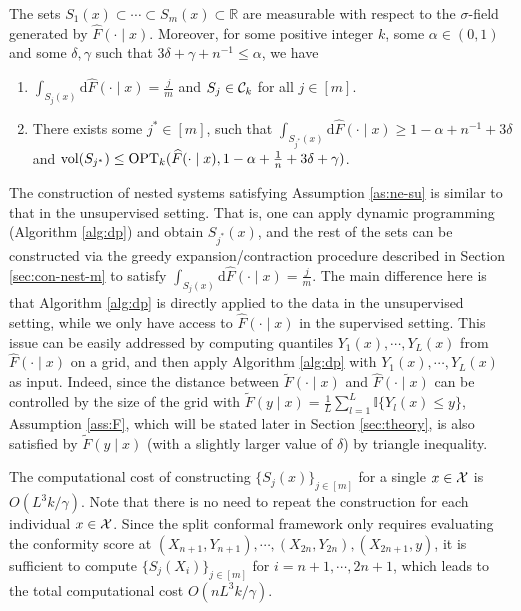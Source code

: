 \begin{assumption}\label{as:ne-su}
The sets $S_1(x)\subset\cdots\subset S_m(x)\subset\mathbb{R}$ are measurable with respect to the $\sigma$-field generated by $\widehat{F}(\cdot\mid x)$. Moreover, for some positive integer $k$, some $\alpha\in(0,1)$ and some $\delta,\gamma$ such that $3\delta+\gamma+n^{-1}\leq \alpha$, we have
\begin{enumerate}
\item $\int_{S_j(x)}\mathrm{d} \widehat{F}(\cdot\mid x)=\frac{j}{m}$ and $S_j\in\mathcal{C}_k$ for all $j\in[m]$.
\item There exists some $j^*\in[m]$, such that $\int_{S_{j^*}(x)}\mathrm{d} \widehat{F}(\cdot\mid x)\geq 1-\alpha+n^{-1}+3\delta$ and $\mathrm{vol}(S_{j^*})\leq \operatorname{OPT}_k(\widehat{F}(\cdot\mid x),1-\alpha+\frac{1}{n}+3\delta+\gamma)$.
\end{enumerate}
\end{assumption}
The construction of nested systems satisfying Assumption \ref{as:ne-su} is similar to that in the unsupervised setting. That is, one can apply dynamic programming (Algorithm \ref{alg:dp}) and obtain $S_{j^*}(x)$, and the rest of the sets can be constructed via the greedy expansion/contraction procedure described in Section \ref{sec:con-nest-m} to satisfy $\int_{S_j(x)}\mathrm{d} \widehat{F}(\cdot\mid x)=\frac{j}{m}$.  The main difference here is that Algorithm \ref{alg:dp} is directly applied to the data in the unsupervised setting, while we only have access to $\widehat{F}(\cdot\mid x)$ in the supervised setting. This issue can be easily addressed by computing quantiles $Y_1(x),\cdots,Y_L(x)$ from $\widehat{F}(\cdot\mid x)$ on a grid, and then apply Algorithm \ref{alg:dp} with $Y_1(x),\cdots,Y_L(x)$ as input. Indeed, since the distance between $\widetilde{F}(\cdot\mid x)$ and $\widehat{F}(\cdot\mid x)$ can be controlled by the size of the grid with $\widetilde{F}(y\mid x)=\frac{1}{L}\sum_{l=1}^L\mathbb{I}\{Y_l(x)\leq y\}$, Assumption \ref{ass:F}, which will be stated later in Section \ref{sec:theory}, is also satisfied by $\widetilde{F}(y\mid x)$ (with a slightly larger value of $\delta$) by triangle inequality.

The computational cost of constructing $\{S_j(x)\}_{j\in[m]}$ for a single $x\in\mathcal{X}$ is $O(L^3k/\gamma)$. Note that there is no need to repeat the construction for each individual $x\in\mathcal{X}$. Since the split conformal framework only requires evaluating the conformity score at $(X_{n+1},Y_{n+1}),\cdots,(X_{2n},Y_{2n}),(X_{2n+1},y)$, it is sufficient to compute $\{S_j(X_i)\}_{j\in[m]}$ for $i=n+1,\cdots,2n+1$, which leads to the total computational cost $O(nL^3k/\gamma)$.

